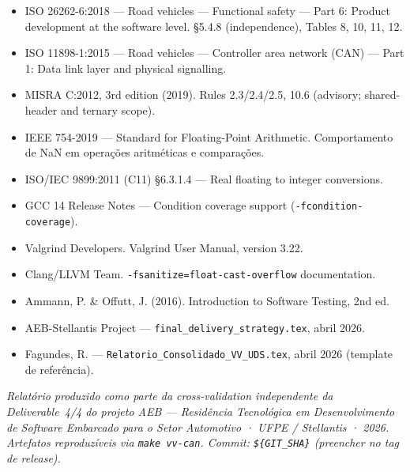 \documentclass[12pt]{article}
\begin{document}
\begin{itemize}[leftmargin=1.2em, itemsep=2pt]
\item ISO 26262-6:2018 --- Road vehicles --- Functional safety --- Part 6: Product development at the software
      level. \S5.4.8 (independence), Tables 8, 10, 11, 12.
\item ISO 11898-1:2015 --- Road vehicles --- Controller area network (CAN) --- Part 1: Data link layer and
      physical signalling.
\item MISRA C:2012, 3rd edition (2019). Rules 2.3/2.4/2.5, 10.6 (advisory; shared-header and ternary scope).
\item IEEE 754-2019 --- Standard for Floating-Point Arithmetic. Comportamento de NaN em operações
      aritméticas e comparações.
\item ISO/IEC 9899:2011 (C11) \S6.3.1.4 --- Real floating to integer conversions.
\item GCC 14 Release Notes --- Condition coverage support (\texttt{-fcondition-coverage}).
\item Valgrind Developers. Valgrind User Manual, version 3.22.
\item Clang/LLVM Team. \texttt{-fsanitize=float-cast-overflow} documentation.
\item Ammann, P. \& Offutt, J. (2016). Introduction to Software Testing, 2nd ed.
\item AEB-Stellantis Project --- \texttt{final\_delivery\_strategy.tex}, abril 2026.
\item Fagundes, R. --- \texttt{Relatorio\_Consolidado\_VV\_UDS.tex}, abril 2026 (template de referência).
\end{itemize}

\vspace{0.5cm}
\noindent
{\footnotesize\itshape
Relatório produzido como parte da cross-validation independente da Deliverable~4/4 do projeto AEB ---
Residência Tecnológica em Desenvolvimento de Software Embarcado para o Setor Automotivo · UFPE /
Stellantis · 2026. Artefatos reproduzíveis via \texttt{make vv-can}. Commit:
\texttt{\$\{GIT\_SHA\}} (preencher no tag de release).
}
\end{document}
